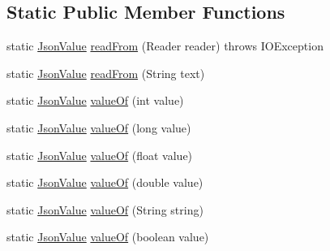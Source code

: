 \subsection*{Static Public Member Functions}
\begin{DoxyCompactItemize}
\item 
static \hyperlink{classcom_1_1ingeniigroup_1_1stratux_1_1_tools_1_1_json_micro_1_1_json_value}{Json\+Value} \hyperlink{classcom_1_1ingeniigroup_1_1stratux_1_1_tools_1_1_json_micro_1_1_json_value_ab880b29601edb653a3e05cfaae8c9699}{read\+From} (Reader reader)  throws I\+O\+Exception 
\item 
static \hyperlink{classcom_1_1ingeniigroup_1_1stratux_1_1_tools_1_1_json_micro_1_1_json_value}{Json\+Value} \hyperlink{classcom_1_1ingeniigroup_1_1stratux_1_1_tools_1_1_json_micro_1_1_json_value_a2dd5b0d5a1d637df8aa1606fd17f9b84}{read\+From} (String text)
\item 
static \hyperlink{classcom_1_1ingeniigroup_1_1stratux_1_1_tools_1_1_json_micro_1_1_json_value}{Json\+Value} \hyperlink{classcom_1_1ingeniigroup_1_1stratux_1_1_tools_1_1_json_micro_1_1_json_value_a1a750fe77d81a8c1d4544cdb2c34297c}{value\+Of} (int value)
\item 
static \hyperlink{classcom_1_1ingeniigroup_1_1stratux_1_1_tools_1_1_json_micro_1_1_json_value}{Json\+Value} \hyperlink{classcom_1_1ingeniigroup_1_1stratux_1_1_tools_1_1_json_micro_1_1_json_value_adc1157e16f80ccfb71d38da3f0bc67bd}{value\+Of} (long value)
\item 
static \hyperlink{classcom_1_1ingeniigroup_1_1stratux_1_1_tools_1_1_json_micro_1_1_json_value}{Json\+Value} \hyperlink{classcom_1_1ingeniigroup_1_1stratux_1_1_tools_1_1_json_micro_1_1_json_value_af01c90aab8bd93c32f12af46501a5727}{value\+Of} (float value)
\item 
static \hyperlink{classcom_1_1ingeniigroup_1_1stratux_1_1_tools_1_1_json_micro_1_1_json_value}{Json\+Value} \hyperlink{classcom_1_1ingeniigroup_1_1stratux_1_1_tools_1_1_json_micro_1_1_json_value_a83b19c00df70ffcbd920b854c6200545}{value\+Of} (double value)
\item 
static \hyperlink{classcom_1_1ingeniigroup_1_1stratux_1_1_tools_1_1_json_micro_1_1_json_value}{Json\+Value} \hyperlink{classcom_1_1ingeniigroup_1_1stratux_1_1_tools_1_1_json_micro_1_1_json_value_a6c3cad61249eea7e6f83437e71681e9f}{value\+Of} (String string)
\item 
static \hyperlink{classcom_1_1ingeniigroup_1_1stratux_1_1_tools_1_1_json_micro_1_1_json_value}{Json\+Value} \hyperlink{classcom_1_1ingeniigroup_1_1stratux_1_1_tools_1_1_json_micro_1_1_json_value_a58bb07f165bad8f405ebfb193ccb9d96}{value\+Of} (boolean value)
\end{DoxyCompactItemize}

